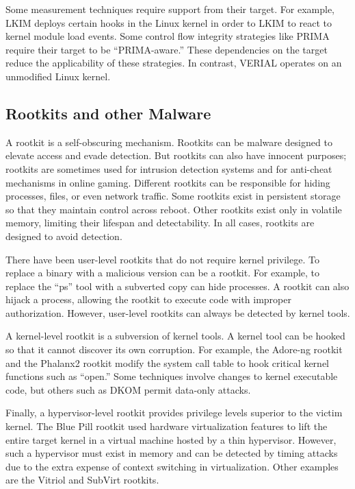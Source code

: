 \documentclass[a4paper,twoside]{article}
\begin{document}
Some measurement techniques require support from their target. For example, LKIM deploys certain hooks in the Linux kernel in order to LKIM to react to kernel module load events. Some control flow integrity strategies like PRIMA require their target to be ``PRIMA-aware.'' These dependencies on the target reduce the applicability of these strategies. In contrast, VERIAL operates on an unmodified Linux kernel.

\subsection{Rootkits and other Malware}

A rootkit is a self-obscuring mechanism. Rootkits can be malware designed to elevate access and evade detection. But rootkits can also have innocent purposes; rootkits are sometimes used for intrusion detection systems and for anti-cheat mechanisms in online gaming. Different rootkits can be responsible for hiding processes, files, or even network traffic. Some rootkits exist in persistent storage so that they maintain control across reboot. Other rootkits exist only in volatile memory, limiting their lifespan and detectability. In all cases, rootkits are designed to avoid detection.

There have been user-level rootkits that do not require kernel privilege. To replace a binary with a malicious version can be a rootkit. For example, to replace the ``ps'' tool with a subverted copy can hide processes. A rootkit can also hijack a process, allowing the rootkit to execute code with improper authorization. However, user-level rootkits can always be detected by kernel tools.

A kernel-level rootkit is a subversion of kernel tools. A kernel tool can be hooked so that it cannot discover its own corruption. For example, the Adore-ng rootkit and the Phalanx2 rootkit modify the system call table to hook critical kernel functions such as ``open.'' Some techniques involve changes to kernel executable code, but others such as DKOM permit data-only attacks.

Finally, a hypervisor-level rootkit provides privilege levels superior to the victim kernel. The Blue Pill rootkit used hardware virtualization features to lift the entire target kernel in a virtual machine hosted by a thin hypervisor. However, such a hypervisor must exist in memory and can be detected by timing attacks due to the extra expense of context switching in virtualization. Other examples are the Vitriol and SubVirt rootkits.
\end{document}
